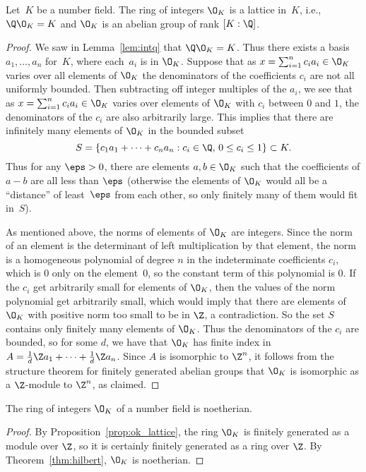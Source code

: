 \begin{proposition}\label{prop:ok_lattice}
	Let~$K$ be a number field.  The ring of integers $\O_K$ is a
	lattice in~$K$, i.e., $\Q\O_K=K$ and $\O_K$ is an abelian group
	of rank $[K:\Q]$.
\end{proposition}
\begin{proof}
	We saw in Lemma~\ref{lem:intq} that $\Q\O_K=K$.  Thus there exists a
	basis $a_1,\ldots, a_n$ for~$K$, where each~$a_i$ is in $\O_K$.
	Suppose that as $x=\sum_{i=1}^n c_i a_i\in \O_K$ varies over all
	elements of $\O_K$ the denominators of the coefficients $c_i$ are not
	all uniformly bounded.  Then subtracting off integer multiples of the
	$a_i$, we see that as $x=\sum_{i=1}^n c_i a_i\in \O_K$ varies over
	elements of $\O_K$ with $c_i$ between $0$ and $1$, the denominators of
	the $c_i$ are also arbitrarily large.  This implies that there are
	infinitely many elements of $\O_K$ in the bounded subset
	$$
		S = \left\{
			c_1 a_1 +\cdots + c_n a_n : c_i \in \Q,\, 0\leq c_i \leq 1
		\right\} \subset K.
	$$
	Thus for any $\eps>0$, there are elements $a,b\in \O_K$ such that the
	coefficients of $a-b$ are all less than $\eps$ (otherwise the elements
	of $\O_K$ would all be a ``distance''
	of least~$\eps$ from each other, so only finitely
	many of them would fit in~$S$).
	
	As mentioned above, the norms of elements of $\O_K$ are integers.
	Since the norm of an element is the determinant of left multiplication
	by that element, the norm is a homogeneous polynomial of degree $n$ in
	the indeterminate coefficients $c_i$, which is $0$ only on the
	element~$0$, so the constant term of this polynomial is $0$.
	If the $c_i$ get arbitrarily small for elements of
	$\O_K$, then the values of the norm polynomial get arbitrarily small,
	which would imply that there are elements of $\O_K$ with positive norm
	too small to be in $\Z$, a contradiction.  So the set $S$ contains
	only finitely many elements of $\O_K$.  Thus the denominators of the
	$c_i$ are bounded, so for some $d$, we have that $\O_K$ has finite
	index in $A=\frac{1}{d}\Z a_1 + \cdots + \frac{1}{d}\Z a_n$.  Since
	$A$ is isomorphic to $\Z^n$, it follows from the structure theorem for
	finitely generated abelian groups that $\O_K$ is isomorphic as a
	$\Z$-module to $\Z^n$, as claimed.
\end{proof}

\begin{corollary}\label{prop:intnoetherian}
	The ring of integers $\O_K$ of a number field is noetherian.
\end{corollary}
\begin{proof}
	By Proposition~\ref{prop:ok_lattice}, the ring $\O_K$ is
	finitely generated as a module over $\Z$, so it is certainly
	finitely generated as a ring over $\Z$.
	By Theorem~\ref{thm:hilbert}, $\O_K$ is noetherian.
\end{proof}


